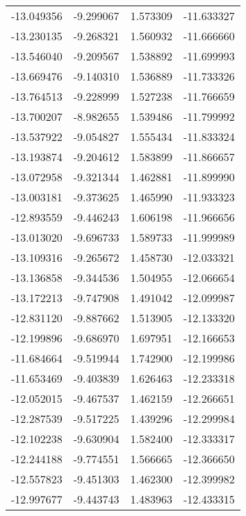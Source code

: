 \begin{tabular}{rrrr}
      -13.049356 &        -9.299067 &    1.573309 & -11.633327 \\
      -13.230135 &        -9.268321 &    1.560932 & -11.666660 \\
      -13.546040 &        -9.209567 &    1.538892 & -11.699993 \\
      -13.669476 &        -9.140310 &    1.536889 & -11.733326 \\
      -13.764513 &        -9.228999 &    1.527238 & -11.766659 \\
      -13.700207 &        -8.982655 &    1.539486 & -11.799992 \\
      -13.537922 &        -9.054827 &    1.555434 & -11.833324 \\
      -13.193874 &        -9.204612 &    1.583899 & -11.866657 \\
      -13.072958 &        -9.321344 &    1.462881 & -11.899990 \\
      -13.003181 &        -9.373625 &    1.465990 & -11.933323 \\
      -12.893559 &        -9.446243 &    1.606198 & -11.966656 \\
      -13.013020 &        -9.696733 &    1.589733 & -11.999989 \\
      -13.109316 &        -9.265672 &    1.458730 & -12.033321 \\
      -13.136858 &        -9.344536 &    1.504955 & -12.066654 \\
      -13.172213 &        -9.747908 &    1.491042 & -12.099987 \\
      -12.831120 &        -9.887662 &    1.513905 & -12.133320 \\
      -12.199896 &        -9.686970 &    1.697951 & -12.166653 \\
      -11.684664 &        -9.519944 &    1.742900 & -12.199986 \\
      -11.653469 &        -9.403839 &    1.626463 & -12.233318 \\
      -12.052015 &        -9.467537 &    1.462159 & -12.266651 \\
      -12.287539 &        -9.517225 &    1.439296 & -12.299984 \\
      -12.102238 &        -9.630904 &    1.582400 & -12.333317 \\
      -12.244188 &        -9.774551 &    1.566665 & -12.366650 \\
      -12.557823 &        -9.451303 &    1.462300 & -12.399982 \\
      -12.997677 &        -9.443743 &    1.483963 & -12.433315 \\

\end{tabular}
